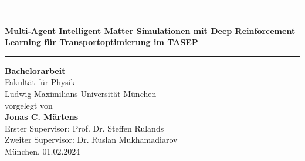 \graphicspath{{img/}}

\begin{titlepage}
    \begin{center}        
        \huge
        \vspace*{0.65cm}
        \rule{\linewidth}{0.3ex}\\
        \vspace*{0.3cm}
        \textbf{Multi-Agent Intelligent Matter Simulationen mit Deep Reinforcement Learning für Transportoptimierung im TASEP}\\
        \rule{\linewidth}{0.3ex}
        \vspace*{4cm}

        \Large
       \textbf{Bachelorarbeit}\\
        \vspace*{0.1cm}
        Fakultät für Physik\\
        \vspace*{0.1cm}
        Ludwig-Maximilians-Universität München\\
        \vspace*{3.5cm}
        \large
        vorgelegt von\\
        \vspace*{0.2cm}
        \Large \textbf{Jonas C. Märtens}\\
        \vspace*{0.6cm}
        \large
        Erster Supervisor: Prof. Dr. Steffen Rulands\\
        Zweiter Supervisor: Dr. Ruslan Mukhamadiarov\\
        \vspace*{2.9cm}
        München, 01.02.2024\\
    \end{center}
\end{titlepage}


%
%
\clearpage{\pagestyle{empty}\cleardoublepage}
%



\cleardoublepage

\tableofcontents
\cleardoublepage
{}
\setcounter{page}{1}